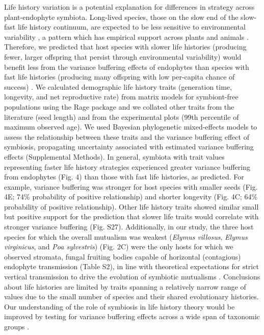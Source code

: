 \documentclass[12pt]{article}
\begin{document}
Life history variation is a potential explanation for differences in strategy across plant-endophyte symbiota.
Long-lived species, those on the slow end of the slow-fast life history continuum, are expected to be less sensitive to environmental variability \cite{murphy1968pattern}, a pattern which has empirical support across plants \cite{compagnoni2021herbaceous} and animals \cite{le2022life}. 
Therefore, we predicted that host species with slower life histories (producing fewer, larger offspring that persist through environmental variability) would benefit less from the variance buffering effects of endophytes than species with fast life histories (producing many offspring with low per-capita chance of success) \cite{rees1996evolutionary,moles2004seedling}.
We calculated demographic life history traits (generation time, longevity, and net reproductive rate) from matrix models for symbiont-free populations using the Rage package \cite{jones2022rcompadre} and we collated other traits from the literature (seed length) and from the experimental plots (99th percentile of maximum observed age). 
We used Bayesian phylogenetic mixed-effects models to assess the relationship between these traits and the variance buffering effect of symbiosis, propagating uncertainty associated with estimated variance buffering effects (Supplemental Methods).
In general, symbiota with trait values representing faster life history strategies experienced greater variance buffering from endophytes (Fig. 4) than those with fast life histories, as predicted. 
For example, variance buffering was stronger for host species with smaller seeds (Fig. 4E; 74\% probability of positive relationship) and shorter longevity (Fig. 4C; 64\% probability of positive relationship).
Other life history traits showed similar small but positive support for the prediction that slower life traits would correlate with stronger variance buffering (Fig. S27).
Additionally, in our study, the three host species for which the overall mutualism was weakest (\emph{Elymus villosus}, \emph{Elymus virginicus}, and \emph{Poa sylvestris}) (Fig. 2C) were the only hosts for which we observed stromata, fungal fruiting bodies capable of horizontal (contagious) endophyte transmission (Table S2), in line with theoretical expectations for strict vertical transmission to drive the evolution of symbiotic mutualisms \cite{fine1975vectors,afkhami2008symbiosis}.
Conclusions about life histories are limited by traits spanning a relatively narrow range of values due to the small number of species and their shared evolutionary histories. 
Our understanding of the role of symbiosis in life history theory would be improved by testing for variance buffering effects across a wide span of taxonomic groups \cite{jeschke2009roles}.
\end{document}

